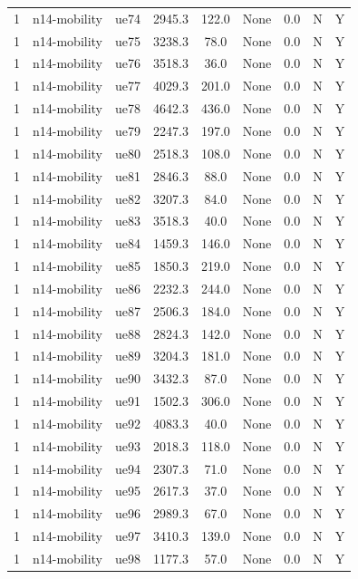 \begin{table}[ht]
\begin{tabular}{|c|c|c|c|c|c|c|c|c|}
1 & n14-mobility & ue74 & 2945.3 & 122.0 & None & 0.0 & N & Y \\
1 & n14-mobility & ue75 & 3238.3 & 78.0 & None & 0.0 & N & Y \\
1 & n14-mobility & ue76 & 3518.3 & 36.0 & None & 0.0 & N & Y \\
1 & n14-mobility & ue77 & 4029.3 & 201.0 & None & 0.0 & N & Y \\
1 & n14-mobility & ue78 & 4642.3 & 436.0 & None & 0.0 & N & Y \\
1 & n14-mobility & ue79 & 2247.3 & 197.0 & None & 0.0 & N & Y \\
1 & n14-mobility & ue80 & 2518.3 & 108.0 & None & 0.0 & N & Y \\
1 & n14-mobility & ue81 & 2846.3 & 88.0 & None & 0.0 & N & Y \\
1 & n14-mobility & ue82 & 3207.3 & 84.0 & None & 0.0 & N & Y \\
1 & n14-mobility & ue83 & 3518.3 & 40.0 & None & 0.0 & N & Y \\
1 & n14-mobility & ue84 & 1459.3 & 146.0 & None & 0.0 & N & Y \\
1 & n14-mobility & ue85 & 1850.3 & 219.0 & None & 0.0 & N & Y \\
1 & n14-mobility & ue86 & 2232.3 & 244.0 & None & 0.0 & N & Y \\
1 & n14-mobility & ue87 & 2506.3 & 184.0 & None & 0.0 & N & Y \\
1 & n14-mobility & ue88 & 2824.3 & 142.0 & None & 0.0 & N & Y \\
1 & n14-mobility & ue89 & 3204.3 & 181.0 & None & 0.0 & N & Y \\
1 & n14-mobility & ue90 & 3432.3 & 87.0 & None & 0.0 & N & Y \\
1 & n14-mobility & ue91 & 1502.3 & 306.0 & None & 0.0 & N & Y \\
1 & n14-mobility & ue92 & 4083.3 & 40.0 & None & 0.0 & N & Y \\
1 & n14-mobility & ue93 & 2018.3 & 118.0 & None & 0.0 & N & Y \\
1 & n14-mobility & ue94 & 2307.3 & 71.0 & None & 0.0 & N & Y \\
1 & n14-mobility & ue95 & 2617.3 & 37.0 & None & 0.0 & N & Y \\
1 & n14-mobility & ue96 & 2989.3 & 67.0 & None & 0.0 & N & Y \\
1 & n14-mobility & ue97 & 3410.3 & 139.0 & None & 0.0 & N & Y \\
1 & n14-mobility & ue98 & 1177.3 & 57.0 & None & 0.0 & N & Y \\

\end{tabular}
\end{table}
